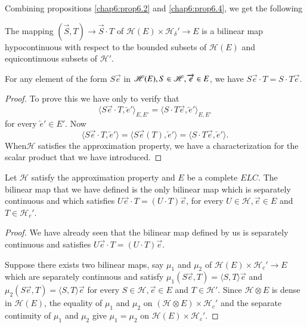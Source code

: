 Combining propositions \ref{chap6:prop6.2} and \ref{chap6:prop6.4}, we
get the following

\begin{prop}\label{chap6:prop6.5}
The mapping $(\overrightarrow{S}, T) \to \overrightarrow{S} \cdot T$ of
$\mathscr{H}(E)\times \mathscr{H}_\delta' \to E$ is a bilinear map
hypocontinuous with respect to the bounded subsets of $\mathscr{H}(E)$
and equicontinuous subsets of $\mathscr{H}'$.
\end{prop}

\begin{prop}\label{chap6:prop6.6}
For any element of the form $S \overrightarrow{e}$ in $\mathscr{H}(E),
S \in \mathscr{H},\break \overrightarrow{e} \in E$, we have $S
\overrightarrow{e}\cdot T = S \cdot T \overrightarrow{e}$.
\end{prop}

\begin{proof}
To prove this we have only to verify that 
$$
\langle S \overrightarrow{e}\cdot T, \overleftarrow{e}' \rangle_{E, E'} =
\langle S\cdot T \overrightarrow{e}, \overleftarrow{e}' \rangle_{E, E'}
$$
for every $\overleftarrow{e}' \in E'$. Now
$$
\langle S \overrightarrow{e} \cdot T, \overleftarrow{e}' \rangle = \langle
S \overrightarrow{e} (T), \overleftarrow{e}' \rangle = \langle S\cdot T
\overrightarrow{e}, \overleftarrow{e}' \rangle.
$$
When\pageoriginale $\mathscr{H}$ satisfies the approximation property,
we have a characterization for the scalar product that we have introduced.
\end{proof}

\begin{prop}\label{chap6:prop6.7}
Let $\mathscr{H}$ satisfy the approximation property and $E$ be a
complete $E L C$. The bilinear map that we have defined is the only
bilinear map which is separately continuous and which satisfies $U
\overrightarrow{e} \cdot T = (U \cdot T) \overrightarrow{e}$, for every $U \in
\mathscr{H}, \overrightarrow{e} \in E$ and $T \in \mathscr{H}_c'$.
\end{prop}

\begin{proof}
We have already seen that the bilinear map defined by us is separately
continuous and satisfies $U \overrightarrow{e} \cdot T = (U\cdot T)
\overrightarrow{e}$. 

Suppose there exists two bilinear maps, say $\mu_1$ and $\mu_2$ of
$\mathscr{H}(E)\times \mathscr{H}_c' \longrightarrow E$ which are
separately continuous and satisfy $\mu_1(S \overrightarrow{e}, T) =
\langle S, T\rangle \overrightarrow{e}$ and $\mu_2(S
\overrightarrow{e}, T) = \langle S, T \rangle \overrightarrow{e}$ for
every $S \in \mathscr{H}, \overrightarrow{e} \in E$ and $T \in
\mathscr{H}'$. Since $\mathscr{H}\otimes E$ is dense in
$\mathscr{H}(E)$, the equality of $\mu_1$ and $\mu_2$ on $(\mathscr{H}
\otimes E) \times \mathscr{H}_c'$ and the separate continuity of
$\mu_1$ and $\mu_2$ give $\mu_1 = \mu_2$ on $\mathscr{H}(E) \times
\mathscr{H}_c'$. 
\end{proof}
